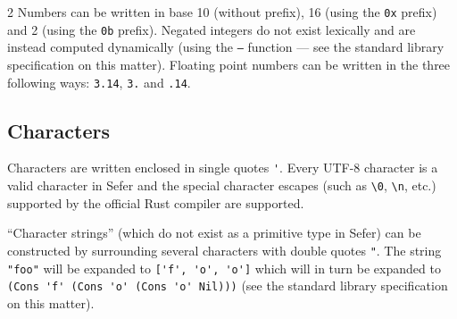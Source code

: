 \begin{multicols*}{2}
  Numbers can be written in base 10 (without prefix), 16 (using the
  \verb|0x| prefix) and 2 (using the \verb|0b| prefix). Negated integers
  do not exist lexically and are instead computed dynamically (using the
  \verb|—| function --- see the standard library specification on this
  matter). Floating point numbers can be written in the three following
  ways: \verb|3.14|, \verb|3.| and \verb|.14|.

  \subsection{Characters}

  Characters are written enclosed in single quotes \verb|'|. Every UTF-8
  character is a valid character in Sefer and the special character
  escapes (such as \verb|\0|, \verb|\n|, etc.) supported by the official
  Rust compiler are supported.

  ``Character strings'' (which do not exist as a primitive type in
  Sefer) can be constructed by surrounding several characters with
  double quotes \verb|"|. The string \verb|"foo"| will be expanded to
  \verb|['f', 'o', 'o']| which will in turn be expanded to
  \verb|(Cons 'f' (Cons 'o' (Cons 'o' Nil)))| (see the standard library
  specification on this matter)\footnotemark.

\end{multicols*}
